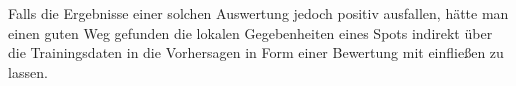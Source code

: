Falls die Ergebnisse einer solchen Auswertung jedoch positiv
ausfallen, hätte man einen guten Weg gefunden die lokalen
Gegebenheiten eines Spots indirekt über die Trainingsdaten in die
Vorhersagen in Form einer Bewertung mit einfließen zu lassen.


